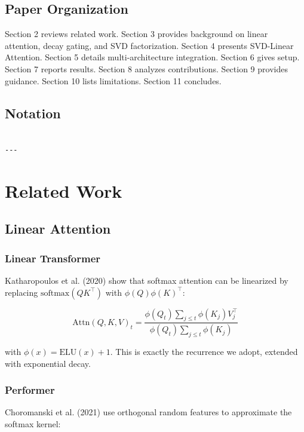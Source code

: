 \subsection{Paper Organization}

Section 2 reviews related work. Section 3 provides background on linear 
attention, decay gating, and SVD factorization. Section 4 presents 
SVD-Linear Attention. Section 5 details multi-architecture integration. 
Section 6 gives setup. Section 7 reports results. Section 8 analyzes 
contributions. Section 9 provides guidance. Section 10 lists limitations. 
Section 11 concludes.



\subsection{Notation}

\begin{lstlisting}

---
\end{lstlisting}


\section{Related Work}

\subsection{Linear Attention}

\subsubsection{Linear Transformer}

Katharopoulos et al. (2020) show that softmax attention can be linearized 
by replacing $\text{softmax}(Q K^\top)$ with $\phi(Q) \phi(K)^\top$:

\[
\text{Attn}(Q, K, V)_t = \frac{\phi(Q_t) \sum_{j \leq t} \phi(K_j) V_j^\top}{\phi(Q_t) \sum_{j \leq t} \phi(K_j)}
\tag{2.1}
\]

with $\phi(x) = \text{ELU}(x) + 1$. This is exactly the recurrence we adopt, 
extended with exponential decay.

\subsubsection{Performer}

Choromanski et al. (2021) use orthogonal random features to approximate 
the softmax kernel:


